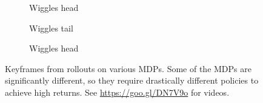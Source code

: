 \documentclass{article}
\begin{document}
\begin{figure}[t!]
\begin{centering}
\begin{subfigure}[b]{0.3\columnwidth}
\caption{Wiggles head}
\end{subfigure}
\hfill
\begin{subfigure}[b]{0.3\columnwidth}
\caption{Wiggles tail}
\end{subfigure}
\hfill
\begin{subfigure}[b]{0.3\columnwidth}
\caption{Wiggles head}
\end{subfigure}
\caption{Keyframes from rollouts on various MDPs. Some of the MDPs are significantly different, so they require drastically different policies to achieve high returns. See \url{https://goo.gl/DN7V9o} for videos.}
\label{fig:frames}
\end{centering}
\end{figure}


\end{document}
